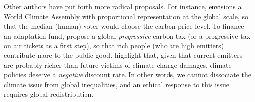 Other authors have put forth more radical proposals. For instance, \citet{weitzman_world_2017} envisions a World Climate Assembly with proportional representation at the global scale, so that the median (human) voter would choose the carbon price level. %
To finance an adaptation fund, \citet{chancel_carbon_2015} propose a global \textit{progressive} carbon tax (or a progressive tax on air tickets as a first step), so that rich people (who are high emitters) contribute more to the public good. 
\citet{fleurbaey_climate_2013} highlight that, given that current emitters are probably richer than future victims of climate change damages, climate policies deserve a \textit{negative} discount rate. In other words, we cannot dissociate the climate issue from global inequalities, and an ethical response to this issue requires global redistribution. 
